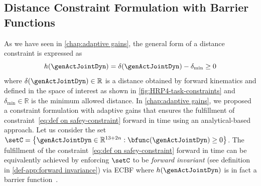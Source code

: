 \subsection{Distance Constraint Formulation with Barrier Functions}\label{subsec-chap3:Safety-Constraint Formulation}
As we have seen in \cref{chap:adaptive gains}, the general form of a distance constraint is expressed as %
\begin{equation}\label{eq:def on safey-constraint}
	h(\genActJointDyn) = \delta(\genActJointDyn) - \delta_{\min} \geq0 
\end{equation} where $\delta(\genActJointDyn)\in\mathbb{R}$ is a distance obtained by forward kinematics and defined in the space of interest as shown in \cref{fig:HRP4-task-constraints} and $\delta_{\min}\in\mathbb{R}$ is the minimum allowed distance.
In \cref{chap:adaptive gains}, we proposed a constraint formulation with adaptive gains that ensures the fulfillment of constraint~\eqref{eq:def on safey-constraint} forward in time using an analytical-based approach. Let us consider the set $\setC=\left\{\genActJointDyn\in \mathbb{R}^{13+2n}:\bfunc(\genActJointDyn)\geq0\right\}$. The fulfillment of the constraint~\eqref{eq:def on safey-constraint} forward in time can be equivalently achieved by enforcing $\setC$ to be \emph{forward invariant} (see definition in \cref{def-app:forward invariance}) via ECBF %
where $h(\genActJointDyn)$ is in fact a barrier function~\cite{nguyen2016acc,ames2019ecc}.

